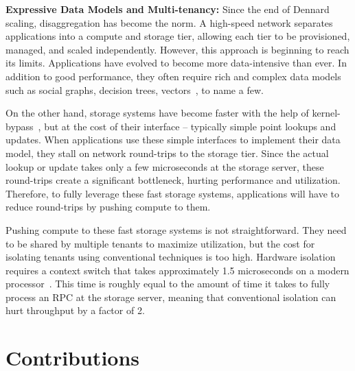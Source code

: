 \textbf{Expressive Data Models and Multi-tenancy:}
Since the end of Dennard scaling, disaggregation has become the norm.
%
A high-speed network separates applications into a compute and
storage tier, allowing each tier to be
provisioned, managed, and scaled independently.
%
However, this approach
is beginning to reach its limits.
%
Applications have evolved to become more data-intensive than ever.
%
In addition to good performance, they often require rich and complex
data models such as social graphs, decision trees,
vectors~\cite{fb-memcache,parameter-server}, to name a few.

On the other hand, storage systems have become faster with the help of
kernel-bypass~\cite{ramcloud,farm-txns}, but at the cost of their
interface – typically simple point lookups and updates.
%
When applications use these simple interfaces to implement their data
model, they stall on network round-trips to the
storage tier.
%
Since the actual lookup or update takes only a few
microseconds at the storage server, these round-trips create a
significant
bottleneck, hurting performance and utilization.
%
Therefore, to fully
leverage these fast storage systems, applications will have to reduce
round-trips by pushing compute to them.

Pushing compute to these fast storage systems is
not straightforward.
%
They need to be shared by multiple tenants to maximize utilization,
but the cost for isolating tenants using conventional techniques is too
high.
%
Hardware isolation
requires a context switch that takes approximately
1.5 microseconds on a modern processor~\cite{splinter}.
%
This time
is roughly equal to the amount of time it takes to
fully process an RPC at the storage server, meaning
that conventional isolation can hurt throughput by
a factor of 2.

%

\section{Contributions}


